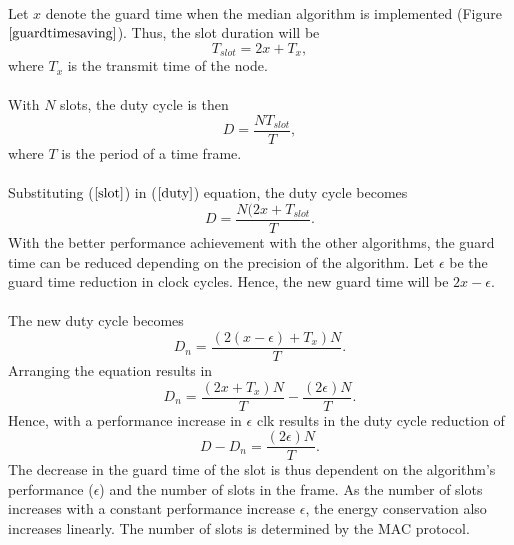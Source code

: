 \documentclass[a4paper,10pt]{report}
\begin{document}
\paragraph*{}
Let $x$ denote the guard time when the median algorithm is implemented (Figure $\ref{guardtimesaving}$). Thus, the slot
duration will be
\begin{equation}
T_{slot}=2x + T_x ,
\label{slot}
\end{equation}
where $T_x$ is the transmit time of the node.
\paragraph*{}
With $N$ slots, the duty cycle is then
\begin{equation}
D = \frac{NT_{slot}}{T}, \label{duty}
\end{equation}
where $T$ is the period of a time frame. \paragraph*{} Substituting ($\ref{slot}$) in ($\ref{duty}$) equation, the duty cycle becomes
\begin{equation}
D= \frac{N(2x+T_{slot}}{T}.
\end{equation}
With the better performance achievement with the other algorithms, the guard time can be reduced depending on the precision of the
algorithm. Let $\epsilon$ be the guard time reduction in clock cycles. Hence, the new guard time will be $2x-\epsilon$.
\paragraph*{} The new duty cycle becomes
\begin{equation}
D_n=\frac{(2(x-\epsilon)+T_x)N}{T}.
\end{equation}
Arranging the equation results in
\begin{equation}
D_n= \frac{(2x+T_x)N}{T} - \frac{(2\epsilon)N}{T}.
\end{equation}
Hence, with a performance increase in $\epsilon$ clk results in the duty cycle reduction of
\begin{equation}
D - D_n = \frac{(2\epsilon)N}{T}.
\end{equation}
The decrease in the guard time of the slot is thus dependent on the algorithm's performance ($\epsilon$) and the number of slots in the
frame. As the number of slots increases with a constant performance increase $\epsilon$, the energy conservation also increases linearly. The number of slots is determined by the MAC protocol.
\end{document}
